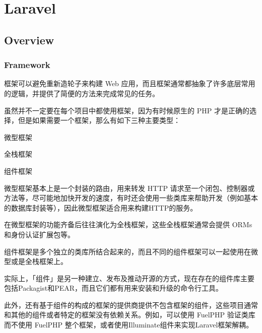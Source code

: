 \part{Laravel}



\chapter{Overview}


\section{Framework}


框架可以避免重新造轮子来构建 Web 应用，而且框架通常都抽象了许多底层常用的逻辑，并提供了简便的方法来完成常见的任务。

虽然并不一定要在每个项目中都使用框架，因为有时候原生的 PHP 才是正确的选择，但是如果需要一个框架，那么有如下三种主要类型：

\begin{compactitem}
\item 微型框架
\item 全栈框架
\item 组件框架
\end{compactitem}

微型框架基本上是一个封装的路由，用来转发 HTTP 请求至一个闭包、控制器或方法等，尽可能地加快开发的速度，有时还会使用一些类库来帮助开发（例如基本的数据库封装等），因此微型框架适合用来构建HTTP的服务。

在微型框架的功能齐备后往往演化为全栈框架，这些全栈框架通常会提供 ORMs和身份认证扩展包等。

组件框架是多个独立的类库所结合起来的，而且不同的组件框架可以一起使用在微型或是全栈框架上。

实际上，「组件」是另一种建立、发布及推动开源的方式，现在存在的组件库主要包括Packagist和PEAR，而且它们都有用来安装和升级的命令行工具。

此外，还有基于组件的构成的框架的提供商提供不包含框架的组件，这些项目通常和其他的组件或者特定的框架没有依赖关系。例如，可以使用 FuelPHP 验证类库而不使用 FuelPHP 整个框架，或者使用Illuminate组件来实现Laravel框架解耦。












